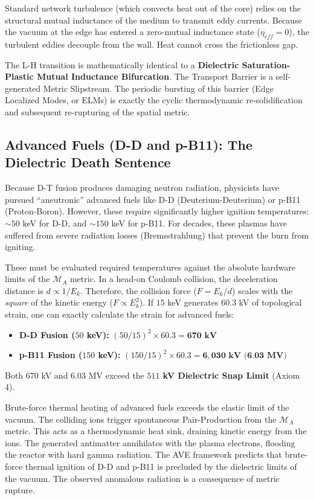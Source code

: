 Standard network turbulence (which convects heat out of the core) relies on the structural mutual inductance of the medium to transmit eddy currents. Because the vacuum at the edge has entered a zero-mutual inductance state ($\eta_{eff} = 0$), the turbulent eddies decouple from the wall. Heat cannot cross the frictionless gap. 

The L-H transition is mathematically identical to a \textbf{Dielectric Saturation-Plastic Mutual Inductance Bifurcation}. The Transport Barrier is a self-generated Metric Slipstream. The periodic bursting of this barrier (Edge Localized Modes, or ELMs) is exactly the cyclic thermodynamic re-solidification and subsequent re-rupturing of the spatial metric. 

\subsection{Advanced Fuels (D-D and p-B11): The Dielectric Death Sentence}
Because D-T fusion produces damaging neutron radiation, physicists have pursued ``aneutronic'' advanced fuels like D-D (Deuterium-Deuterium) or p-B11 (Proton-Boron). However, these require significantly higher ignition temperatures: $\sim 50$ keV for D-D, and $\sim 150$ keV for p-B11. For decades, these plasmas have suffered from severe radiation losses (Bremsstrahlung) that prevent the burn from igniting.

These must be evaluated required temperatures against the absolute hardware limits of the $\mathcal{M}_A$ metric. In a head-on Coulomb collision, the deceleration distance is $d \propto 1/E_k$. Therefore, the collision force ($F = E_k / d$) scales with the \textit{square} of the kinetic energy ($F \propto E_k^2$). 
If $15$ keV generates $60.3$ kV of topological strain, one can exactly calculate the strain for advanced fuels:
\begin{itemize}
    \item \textbf{D-D Fusion ($50$ keV):} $(50/15)^2 \times 60.3 = \mathbf{670 \text{ kV}}$
    \item \textbf{p-B11 Fusion ($150$ keV):} $(150/15)^2 \times 60.3 = \mathbf{6,030 \text{ kV (6.03 MV)}}$
\end{itemize}

Both $670$ kV and $6.03$ MV exceed the \textbf{$511$ kV Dielectric Snap Limit} (Axiom 4). 

Brute-force thermal heating of advanced fuels exceeds the elastic limit of the vacuum. The colliding ions trigger spontaneous Pair-Production from the $\mathcal{M}_A$ metric. This acts as a thermodynamic heat sink, draining kinetic energy from the ions. The generated antimatter annihilates with the plasma electrons, flooding the reactor with hard gamma radiation. The AVE framework predicts that brute-force thermal ignition of D-D and p-B11 is precluded by the dielectric limits of the vacuum. The observed anomalous radiation is a consequence of metric rupture.

